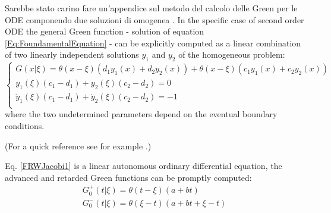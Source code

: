 \documentclass[Main]{subfiles}
\begin{document}
\ifToninus
	\begin{Warning}
		Sarebbe stato carino fare un'appendice sul metodo del calcolo delle Green per le ODE componendo due soluzioni di omogenea \cite{Tornberg}.
		In the specific case of second order ODE the general Green function  - solution of equation \ref{Eq:FoundamentalEquation} - can be explicitly computed as a linear combination of two linearly independent solutions $y_1$ and $y_2$ of the homogeneous problem:
			\begin{equation}
			\begin{cases}
                        G( x \vert \xi) = \theta( x - \xi) \left(d_1 y_1(x) + d_2 y_2(x) \right) + \theta( x - \xi) \left(c_1 y_1(x) + c_2 y_2(x) \right) \\
						y_1(\xi) (c_1-d_1) + y_2(\xi) ( c_2 - d_2) = 0 \\
						\dot{y}_1(\xi) (c_1-d_1) + \dot{y}_2(\xi) ( c_2 - d_2) = -1 \\
            \end{cases}
			\end{equation}
			where the two undetermined parameters depend on the eventual boundary conditions.

			(For a quick reference see for example \cite{Tornberg}.)

			 Eq. \ref{FRWJacobi1} is a linear autonomous ordinary differential equation, the advanced and retarded Green functions can be promptly computed:
			\begin{eqnarray}\label{SimpleGreenFunction}
				G^+_0(t \vert \xi) = \theta(t-\xi) \left(a +b t \right) \nonumber\\
				G^-_0( t \vert \xi) = \theta(\xi -t) \left( a +b t + \xi -t\right)
			\end{eqnarray}
	\end{Warning}
\fi
\end{document}
